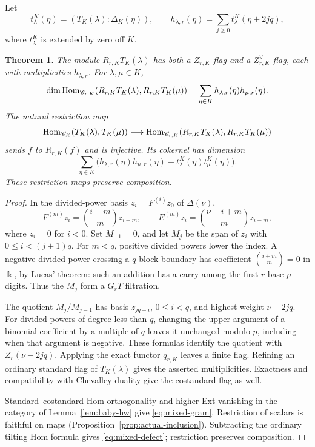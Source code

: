\documentclass[11pt,reqno]{amsart}
\newcommand{\kk}{\Bbbk}\newcommand{\ZZ}{\mathbb Z}\newcommand{\NN}{\mathbb N}
\newcommand{\Hom}{\operatorname{Hom}}\newcommand{\End}{\operatorname{End}}\newcommand{\Ext}{\operatorname{Ext}}
\newtheorem{theorem}{Theorem}[section]
\theoremstyle{definition}
\theoremstyle{remark}
\numberwithin{equation}{section}
\begin{document}
Let
\[
 t^K_\lambda(\eta)=(T_K(\lambda):\Delta_K(\eta)),
 \qquad
 h_{\lambda,r}(\eta)=\sum_{j\geq0}t^K_\lambda(\eta+2jq),
\]
where $t^K_\lambda$ is extended by zero off $K$.

\begin{theorem}\label{thm:mixed-gram}
The module $R_{r,K}T_K(\lambda)$ has both a $Z_{r,K}$-flag and a
$Z^\vee_{r,K}$-flag, each with multiplicities $h_{\lambda,r}$.
For $\lambda,\mu\in K$,
\begin{equation}
 \dim\Hom_{\CC_{r,K}}(R_{r,K}T_K(\lambda),R_{r,K}T_K(\mu))
   =\sum_{\eta\in K}h_{\lambda,r}(\eta)h_{\mu,r}(\eta).
      \label{eq:mixed-gram}
\end{equation}
The natural restriction map
\[
 \Hom_{\CC_K}(T_K(\lambda),T_K(\mu))
       \longrightarrow\Hom_{\CC_{r,K}}(R_{r,K}T_K(\lambda),
                                      R_{r,K}T_K(\mu))
\]
sends $f$ to $R_{r,K}(f)$ and is injective. Its cokernel has dimension
\begin{equation}
   \sum_{\eta\in K}
     \bigl(h_{\lambda,r}(\eta)h_{\mu,r}(\eta)
                -t^K_\lambda(\eta)t^K_\mu(\eta)\bigr).
      \label{eq:mixed-defect}
\end{equation}
These restriction maps preserve composition.
\end{theorem}
\begin{proof}
In the divided-power basis $z_i=F^{(i)}z_0$ of $\Delta(\nu)$,
\[
 F^{(m)}z_i=\binom{i+m}{m}z_{i+m},\qquad
 E^{(m)}z_i=\binom{\nu-i+m}{m}z_{i-m},
\]
where $z_i=0$ for $i<0$. Set $M_{-1}=0$, and let $M_j$ be the
span of $z_i$ with $0\leq i<(j+1)q$.
For $m<q$, positive divided powers lower the index. A negative
divided power crossing a $q$-block boundary has coefficient
$\binom{i+m}{m}=0$ in $\kk$, by Lucas' theorem: such an addition
has a carry among the first $r$ base-$p$ digits. Thus the $M_j$
form a $G_rT$ filtration.

The quotient $M_j/M_{j-1}$ has basis $z_{jq+i}$, $0\leq i<q$,
and highest weight $\nu-2jq$. For divided powers of degree less than
$q$, changing the upper argument of a binomial coefficient by a
multiple of $q$ leaves it unchanged modulo $p$, including when that
argument is negative. These formulas identify the quotient with
$Z_r(\nu-2jq)$. Applying the exact functor $q_{r,K}$ leaves a finite
flag. Refining an ordinary standard flag of $T_K(\lambda)$ gives the
asserted multiplicities. Exactness and compatibility with Chevalley
duality give the costandard flag as well.

Standard--costandard Hom orthogonality and higher Ext vanishing in
the category of Lemma~\ref{lem:baby-hw} give \eqref{eq:mixed-gram}.
Restriction of scalars is faithful on maps
(Proposition~\ref{prop:actual-inclusion}). Subtracting the ordinary tilting Hom
formula gives \eqref{eq:mixed-defect}; restriction preserves composition.
\end{proof}
\end{document}
